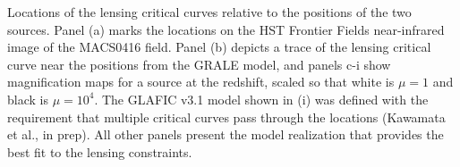 \label{fig:SpockCriticalCurves}
Locations of the lensing critical curves relative to the positions of
the two \spock sources. Panel (a) marks the \spock locations on the
HST Frontier Fields near-infrared image of the MACS0416 field.
Panel (b) depicts a trace of the
lensing critical curve near the \spock positions from the GRALE
model, and panels c-i show magnification maps for a source at the \spock redshift, scaled so that white is $\mu=1$ and black is $\mu=10^4$. 
The GLAFIC v3.1 model shown in (i) was defined with the requirement
that multiple critical curves pass through the \spock locations
(Kawamata et al., in prep).  All other panels present the model
realization that provides the best fit to the lensing constraints.
